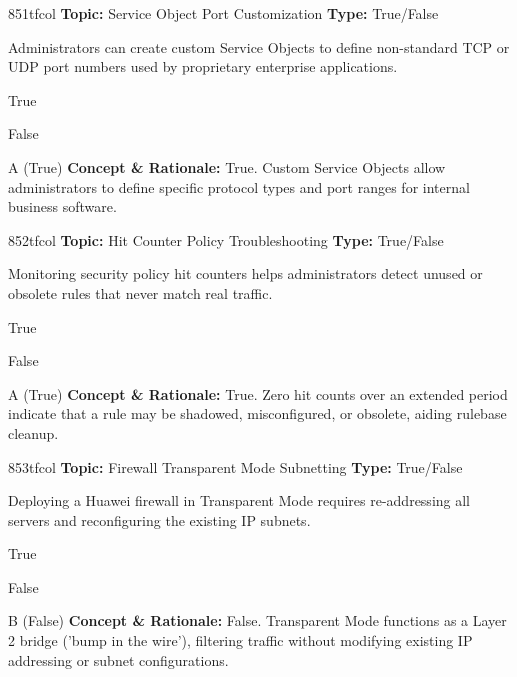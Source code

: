 \begin{qcard}{851}{tfcol}
\textcolor{darkslate!75}{\small\textbf{Topic:} Service Object Port Customization \hfill \textbf{Type:} True/False}\vspace{0.4em}\par
Administrators can create custom Service Objects to define non-standard TCP or UDP port numbers used by proprietary enterprise applications.
\begin{qoptions}
\item True
\item False
\end{qoptions}
\end{qcard}
\nopagebreak
\begin{explainbox}{A (True)}
\textbf{Concept \& Rationale:} True. Custom Service Objects allow administrators to define specific protocol types and port ranges for internal business software.
\end{explainbox}

\begin{qcard}{852}{tfcol}
\textcolor{darkslate!75}{\small\textbf{Topic:} Hit Counter Policy Troubleshooting \hfill \textbf{Type:} True/False}\vspace{0.4em}\par
Monitoring security policy hit counters helps administrators detect unused or obsolete rules that never match real traffic.
\begin{qoptions}
\item True
\item False
\end{qoptions}
\end{qcard}
\nopagebreak
\begin{explainbox}{A (True)}
\textbf{Concept \& Rationale:} True. Zero hit counts over an extended period indicate that a rule may be shadowed, misconfigured, or obsolete, aiding rulebase cleanup.
\end{explainbox}

\begin{qcard}{853}{tfcol}
\textcolor{darkslate!75}{\small\textbf{Topic:} Firewall Transparent Mode Subnetting \hfill \textbf{Type:} True/False}\vspace{0.4em}\par
Deploying a Huawei firewall in Transparent Mode requires re-addressing all servers and reconfiguring the existing IP subnets.
\begin{qoptions}
\item True
\item False
\end{qoptions}
\end{qcard}
\nopagebreak
\begin{explainbox}{B (False)}
\textbf{Concept \& Rationale:} False. Transparent Mode functions as a Layer 2 bridge ('bump in the wire'), filtering traffic without modifying existing IP addressing or subnet configurations.
\end{explainbox}

